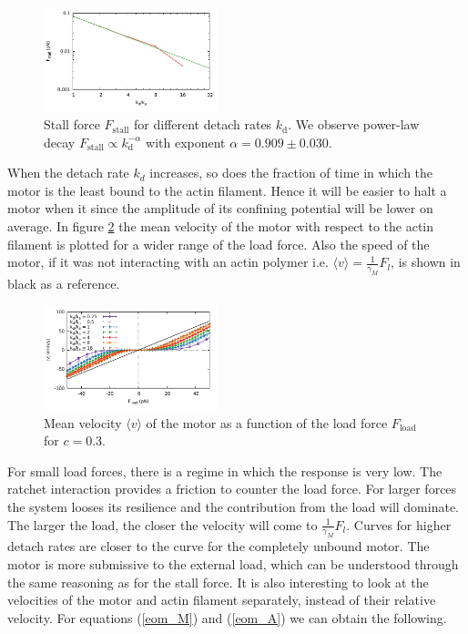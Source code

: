 \documentclass[aps,pre,twocolumn,showpacs,showkeys,a4paper]{revtex4}
\begin{document}
\begin{figure}[t]
\centering
\includegraphics[width=0.45\textwidth,height=!]{k_Fstall}
\caption{Stall force $F_\text{stall}$ for different detach rates $k_\text{d}$.
We observe power-law decay $F_\text{stall} \propto k_\text{d}^{-\alpha}$ with exponent $\alpha = 0.909 \pm 0.030$. 
}
\label{Fig: k_Fstall} 
\end{figure}
When the detach rate $k_{d}$ increases, so does the fraction of time in which the motor is the least bound to the actin filament. 
Hence it will be easier to halt a motor when it since the amplitude of its confining potential will be lower on average.
In figure \ref{Fig: F_v} the mean velocity of the motor with respect to the actin filament is plotted for a wider range of the load force. 
Also the speed of the motor, if it was not  interacting with an actin polymer i.e. $\langle v \rangle = \frac{1}{\gamma_M}F_l$, is shown in black as a reference.
\begin{figure}[b]
\centering
\includegraphics[width=0.45\textwidth,height=!]{F_v}
\caption{Mean velocity $\langle v \rangle$ of the motor as a function of the load force $F_\text{load}$ for $c=0.3$.}
\label{Fig: F_v} 
\end{figure}
For small load forces, there is a regime in which the response is very low. 
The ratchet interaction provides a friction to counter the load force. 
For larger forces the system looses its resilience and the contribution from the load will dominate. 
The larger the load, the closer the velocity will come to  $\frac{1}{\gamma_M}F_l$.
Curves for higher detach rates are closer to the curve for the completely unbound motor. 
The motor is more submissive to the external load, which can be understood through the same reasoning as for the stall force.
It is also interesting to look at the velocities of the motor and actin filament separately, instead of their relative velocity. 
For equations (\ref{eom_M}) and (\ref{eom_A}) we can obtain the following.
\end{document}
